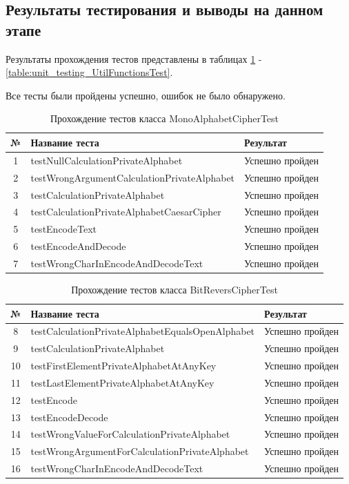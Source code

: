 \documentclass[a4paper,12pt]{article}
\begin{document}
\newpage\subsection{Результаты тестирования и выводы на данном этапе}
Результаты прохождения тестов представлены в таблицах \ref{table:unit_testing_MonoAlphabetCipherTest} - \ref{table:unit_testing_UtilFunctionsTest}.

Все тесты были пройдены успешно, ошибок не было обнаружено.

\begin{table}[h]
	\caption{Прохождение тестов класса MonoAlphabetCipherTest}
	\centering
	\begin{tabular}{|c|l|l|}
	\hline 
	№ &  Название теста & Результат \\ 
	\hline 
	1 &  testNullCalculationPrivateAlphabet & Успешно пройден  \\
	\hline 
	2 &  testWrongArgumentCalculationPrivateAlphabet & Успешно пройден  \\
	\hline 
	3 & testCalculationPrivateAlphabet & Успешно пройден  \\
	\hline 
	4 & testCalculationPrivateAlphabetCaesarCipher & Успешно пройден  \\
	\hline 
	5 & testEncodeText & Успешно пройден  \\
	\hline 
	6 & testEncodeAndDecode & Успешно пройден  \\
	\hline 
	7 & testWrongCharInEncodeAndDecodeText & Успешно пройден  \\
	\hline 
\end{tabular} 
\label{table:unit_testing_MonoAlphabetCipherTest} 
\end{table}

\begin{table}[h]
	\caption{Прохождение тестов класса BitReversCipherTest}
	\centering
	\begin{tabular}{|c|l|l|}
	\hline 
	№ &  Название теста & Результат \\ 
	\hline 
	8 &  testCalculationPrivateAlphabetEqualsOpenAlphabet & Успешно пройден  \\
	\hline 
	9 &  testCalculationPrivateAlphabet & Успешно пройден  \\
	\hline 
	10 & testFirstElementPrivateAlphabetAtAnyKey & Успешно пройден  \\
	\hline 
	11 & testLastElementPrivateAlphabetAtAnyKey & Успешно пройден  \\
	\hline 
	12 & testEncode & Успешно пройден  \\
	\hline 
	13 & testEncodeDecode & Успешно пройден  \\
	\hline 
	14 & testWrongValueForCalculationPrivateAlphabet & Успешно пройден  \\
	\hline 
	15 & testWrongArgumentForCalculationPrivateAlphabet & Успешно пройден  \\
	\hline 
	16 & testWrongCharInEncodeAndDecodeText & Успешно пройден  \\
	\hline 
\end{tabular} 
\label{table:unit_testing_BitReversCipherTest} 
\end{table}
\end{document}
